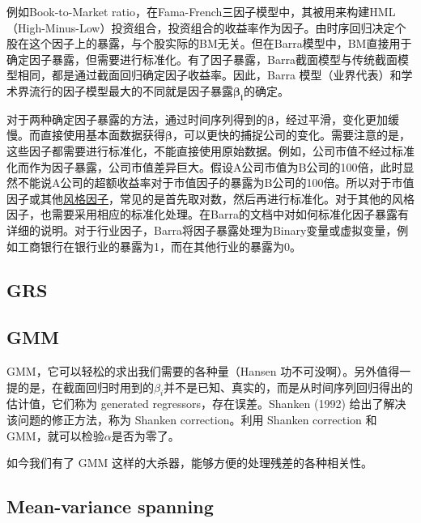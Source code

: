 \documentclass[11pt]{article}
\begin{document}
例如Book-to-Market ratio，在Fama-French三因子模型中，其被用来构建HML（High-Minus-Low）投资组合，投资组合的收益率作为因子。由时序回归决定个股在这个因子上的暴露，与个股实际的BM无关。但在Barra模型中，BM直接用于确定因子暴露，但需要进行标准化。有了因子暴露，Barra截面模型与传统截面模型相同，都是通过截面回归确定因子收益率。因此，Barra 模型（业界代表）和学术界流行的因子模型最大的不同就是因子暴露$\bm{\beta_i}$的确定。

对于两种确定因子暴露的方法，通过时间序列得到的$\bm{\beta}$，经过平滑，变化更加缓慢。而直接使用基本面数据获得$\bm{\beta}$，可以更快的捕捉公司的变化。需要注意的是，这些因子都需要进行标准化，不能直接使用原始数据。例如，公司市值不经过标准化而作为因子暴露，公司市值差异巨大。假设A公司市值为B公司的100倍，此时显然不能说A公司的超额收益率对于市值因子的暴露为B公司的100倍。所以对于市值因子或其他\uline{风格因子}，常见的是首先取对数，然后再进行标准化。对于其他的风格因子，也需要采用相应的标准化处理。在Barra的文档中对如何标准化因子暴露有详细的说明。对于行业因子，Barra将因子暴露处理为Binary变量或虚拟变量，例如工商银行在银行业的暴露为1，而在其他行业的暴露为0。

\subsection{GRS}

\subsection{GMM}

GMM，它可以轻松的求出我们需要的各种量（Hansen 功不可没啊）。另外值得一提的是，在截面回归时用到的$\beta_i$并不是已知、真实的，而是从时间序列回归得出的估计值，它们称为 generated regressors，存在误差。Shanken (1992) 给出了解决该问题的修正方法，称为 Shanken correction。利用 Shanken correction 和 GMM，就可以检验$\alpha$是否为零了。

如今我们有了 GMM 这样的大杀器，能够方便的处理残差的各种相关性。

\subsection{Mean-variance spanning}


\appendix
\end{document}
